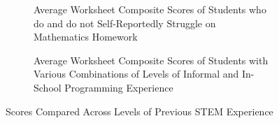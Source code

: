  \begin{figure}
     \centering
    \begin{subfigure}[t]{0.49\textwidth}
        \caption{Average \ts Worksheet Composite Scores of Students who do and do not Self-Reportedly Struggle on Mathematics Homework}
    \end{subfigure}
    \hfill
    \begin{subfigure}[t]{0.49\textwidth}
    \caption{Average \ts Worksheet Composite Scores of Students with Various Combinations of Levels of Informal and In-School Programming Experience} 
    \end{subfigure}
    \caption{\ts Scores Compared Across Levels of Previous STEM Experience}
    \label{fig:math_programming}
\end{figure}

